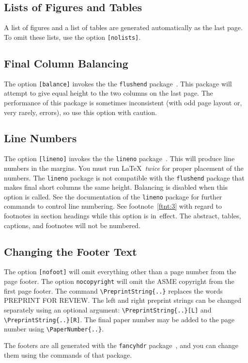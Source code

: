 \documentclass[subscriptcorrection,upint,varvw,mathalfa=cal=euler,barcolor=black,balance,hyphenate,french,pdf-a,nolists]{asmejour}
\begin{document}
\subsection{Lists of Figures and Tables} A list of figures and a list of tables are generated automatically as the last page.  To omit these lists, use the option \texttt{[nolists]}.

\subsection{Final Column Balancing} The option \texttt{[balance]} invokes the the \texttt{flushend} package~\cite{tolusis}.
This package will attempt to give equal height to the two columns on the last page. The performance of this package is sometimes inconsistent (with odd page layout or, very rarely, errors), so use this option with caution.

\subsection{Line Numbers} The option \texttt{[lineno]} invokes the the \texttt{lineno} package~\cite{bottcher}.  This will produce line numbers in the margins. You must run \LaTeX\ \textit{twice} for proper placement of the numbers. The \texttt{lineno} package is not compatible with the \texttt{flushend} package that makes final short columns the same height. Balancing is disabled when this option is called. See the documentation of the \texttt{lineno} package for further commands to control line numbering. See footnote~\ref{ftnt:3} with regard to footnotes in section headings while this option is in~effect. The abstract, tables, captions, and footnotes will not be numbered.

\subsection{Changing the Footer Text}\label{sec:footer} The option \texttt{[nofoot]} will omit everything other than a page number from the page footer.  The option \texttt{nocopyright} will omit the ASME copyright from the first page footer. The command \verb|\PreprintString{..}| replaces the words \textsf{PREPRINT FOR REVIEW}. The left and right preprint strings can be changed separately using an optional argument: \verb|\PreprintString{..}[L]| and \verb|\PreprintString{..}[R]|.
The final paper number may be added to the page number using \verb|\PaperNumber{..}|.

The footers are all generated with the \texttt{fancyhdr} package~\cite{oostrum}, and you can change them using the commands of that package.
\end{document}
